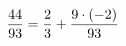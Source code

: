 \documentclass[preview]{standalone}
\begin{document}
\begin{align*}
\special{dvisvgm:raw <g id='unique000'>}\frac{44}{93} = \frac{2}{3} +\frac{9 \cdot (-2)}{93}\special{dvisvgm:raw </g>}
\end{align*}
\end{document}

